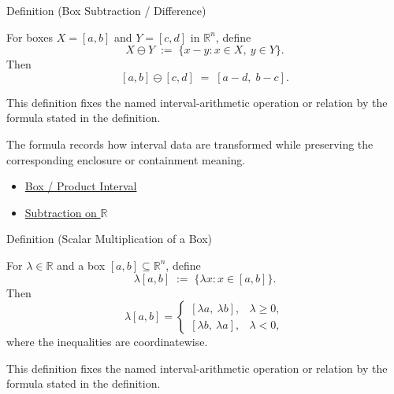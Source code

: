 \begin{definitionbox}{Definition (Box Subtraction / Difference)}
\begin{definition}\label{def:box-sub}
For boxes $X=[a,b]$ and $Y=[c,d]$ in $\mathbb{R}^n$, define
\[
X\ominus Y \;:=\; \{x-y : x\in X,\ y\in Y\}.
\]
Then
\[
[a,b]\ominus[c,d] \;=\; [a-d,\; b-c].
\]
\end{definition}
\end{definitionbox}

\begin{remark*}
This definition fixes the named interval-arithmetic operation or relation by
the formula stated in the definition.
\end{remark*}

\begin{remark*}[Interpretation]
The formula records how interval data are transformed while preserving the
corresponding enclosure or containment meaning.
\end{remark*}

\begin{dependencies}
\begin{itemize}
  \item \hyperref[def:product-interval-box]{Box / Product Interval}
  \item \hyperref[def:subtraction-on-r]{Subtraction on $\mathbb{R}$}
\end{itemize}
\end{dependencies}

\begin{definitionbox}{Definition (Scalar Multiplication of a Box)}
\begin{definition}\label{def:box-smul}
For $\lambda\in\mathbb{R}$ and a box $[a,b]\subseteq\mathbb{R}^n$, define
\[
\lambda[a,b] \;:=\; \{\lambda x : x\in[a,b]\}.
\]
Then
\[
\lambda[a,b]=
\begin{cases}
[\lambda a,\ \lambda b], & \lambda\ge 0,\\[4pt]
[\lambda b,\ \lambda a], & \lambda<0,
\end{cases}
\]
where the inequalities are coordinatewise.
\end{definition}
\end{definitionbox}

\begin{remark*}
This definition fixes the named interval-arithmetic operation or relation by
the formula stated in the definition.
\end{remark*}

